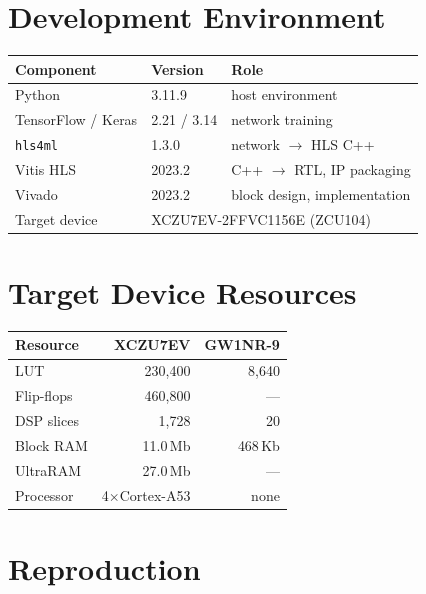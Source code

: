 \documentclass[11pt,a4paper]{article}
\begin{document}
\newpage
\appendix

\section{Development Environment}

\begin{table}[h]
\centering
\begin{tabular}{lll}
\toprule
\textbf{Component} & \textbf{Version} & \textbf{Role} \\
\midrule
Python            & 3.11.9      & host environment \\
TensorFlow / Keras& 2.21 / 3.14 & network training \\
\texttt{hls4ml}   & 1.3.0       & network $\rightarrow$ HLS C++ \\
Vitis HLS         & 2023.2      & C++ $\rightarrow$ RTL, IP packaging \\
Vivado            & 2023.2      & block design, implementation \\
Target device     & \multicolumn{2}{l}{XCZU7EV-2FFVC1156E (ZCU104)} \\
\bottomrule
\end{tabular}
\end{table}

\section{Target Device Resources}

\begin{table}[h]
\centering
\begin{tabular}{lrr}
\toprule
\textbf{Resource} & \textbf{XCZU7EV} & \textbf{GW1NR-9} \\
\midrule
LUT             & 230{,}400 & 8{,}640 \\
Flip-flops      & 460{,}800 & --- \\
DSP slices      & 1{,}728   & 20 \\
Block RAM       & 11.0\,Mb  & 468\,Kb \\
UltraRAM        & 27.0\,Mb  & --- \\
Processor       & \multicolumn{1}{c}{4$\times$Cortex-A53} & none \\
\bottomrule
\end{tabular}
\end{table}

\section{Reproduction}
\end{document}
